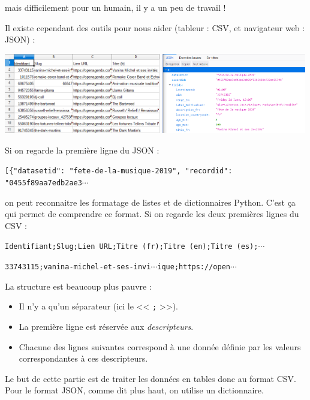 	mais difficilement pour un humain, il y a un peu de travail !

Il existe cependant des outils pour nous aider (tableur : CSV, et navigateur web : JSON) :
	
	{\centering\includegraphics[height=3.5cm]{images/fetecsv2.png} \qquad \includegraphics[height=3.5cm]{images/fetejson2.png}\par}

Si on regarde la première ligne du JSON : 

\texttt{[\{"datasetid": "fete-de-la-musique-2019", "recordid": "0455f89aa7edb2ae3}$\cdots$

on peut reconnaitre les formatage de listes et de dictionnaires Python. C'est ça qui permet de comprendre ce format. Si on regarde les deux premières lignes du CSV :

\texttt{Identifiant;Slug;Lien URL;Titre (fr);Titre (en);Titre (es);}$\cdots$

\texttt{33743115;vanina-michel-et-ses-invi}$\cdots$\texttt{ique;https://open}$\cdots$

La structure est beaucoup plus pauvre : 

\begin{itemize}
 \item Il n'y a qu'un séparateur (ici le << \texttt{;} >>).  
 \item La première ligne est réservée aux \emph{descripteurs}.
 \item Chacune des lignes suivantes correspond à une donnée définie par les valeurs correspondantes à ces descripteurs.
\end{itemize}

\medskip

Le but de cette partie est de traiter les données en tables donc au format CSV. Pour le format JSON, comme dit plus haut, on utilise un dictionnaire.

